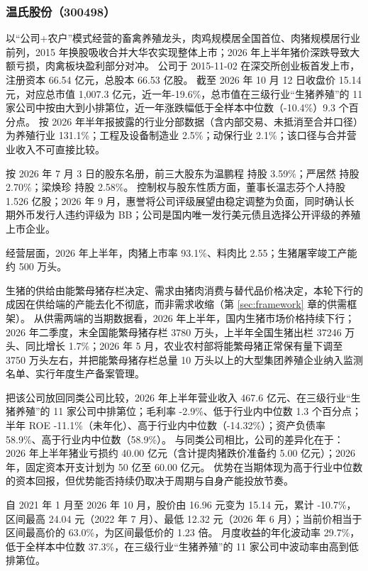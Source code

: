 \subsubsection{温氏股份（300498）}
\label{co:300498}

 以“公司+农户”模式经营的畜禽养殖龙头，肉鸡规模居全国首位、肉猪规模居行业前列，2015 年换股吸收合并大华农实现整体上市；2026 年上半年猪价深跌导致大额亏损，肉禽板块盈利部分对冲。 公司于 2015-11-02 在深交所创业板首发上市，注册资本 66.54 亿元，总股本 66.53 亿股。 截至 2026 年 10 月 12 日收盘价 15.14 元，对应总市值 1,007.3 亿元，近一年-19.6\%，总市值在三级行业“生猪养殖”的 11 家公司中按由大到小排第位，近一年涨跌幅低于全样本中位数（-10.4\%）9.3 个百分点。 按 2026 年半年报披露的行业分部数据（含内部交易、未抵消至合并口径）为养殖行业 131.1\%；工程及设备制造业 2.5\%；动保行业 2.1\%；该口径与合并营业收入不可直接比较。

 按 2026 年 7 月 3 日的股东名册，前三大股东为温鹏程 持股 3.59\%；严居然 持股 2.70\%；梁焕珍 持股 2.58\%。 控制权与股东性质方面，董事长温志芬个人持股 1.526 亿股；2026 年 9 月，惠誉将公司评级展望由稳定调整为负面，同时确认长期外币发行人违约评级为 BB；公司是国内唯一发行美元债且选择公开评级的养殖上市企业。

 经营层面，2026 年上半年，肉猪上市率 93.1\%、料肉比 2.55；生猪屠宰竣工产能约 500 万头。

 生猪的供给由能繁母猪存栏决定、需求由猪肉消费与替代品价格决定，本轮下行的成因在供给端的产能去化不彻底，而非需求收缩（第 \ref{sec:framework} 章的供需框架）。 从供需两端的当期数据看，2026 年上半年，国内生猪市场价格持续下行；2026 年二季度，末全国能繁母猪存栏 3780 万头，上半年全国生猪出栏 37246 万头、同比增长 1.7\%；2026 年 5 月，农业农村部将能繁母猪正常保有量下调至 3750 万头左右，并把能繁母猪存栏总量 10 万头以上的大型集团养殖企业纳入监测名单、实行年度生产备案管理。

 把该公司放回同类公司比较，2026 年上半年营业收入 467.6 亿元、在三级行业“生猪养殖”的 11 家公司中排第位；毛利率 -2.9\%、低于行业内中位数 1.3 个百分点；半年 ROE -11.1\%（未年化）、高于行业内中位数（-14.32\%）；资产负债率 58.9\%、高于行业内中位数（58.9\%）。 与同类公司相比，公司的差异化在于：2026 年上半年猪业亏损约 40.00 亿元（含计提肉猪跌价准备约 5.00 亿元）；2026 年，固定资本开支计划为 50 亿至 60.00 亿元。 优势在当期体现为高于行业中位数的资本回报，但优势能否持续仍取决于周期与自身产能投放节奏。

 自 2021 年 1 月至 2026 年 10 月，股价由 16.96 元变为 15.14 元，累计 -10.7\%，区间最高 24.04 元（2022 年 7 月）、最低 12.32 元（2026 年 6 月）；当前价相当于区间最高价的 63.0\%，为区间最低价的 1.23 倍。 月度收益的年化波动率 29.7\%，低于全样本中位数 37.3\%，在三级行业“生猪养殖”的 11 家公司中波动率由高到低排第位。

